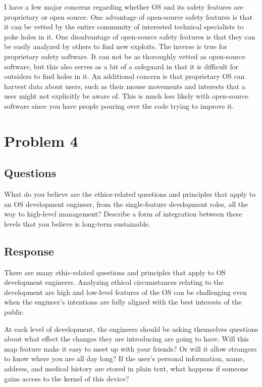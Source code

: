 \documentclass{assignment-x}
\begin{document}
I have a few major concerns regarding whether OS and its safety features are proprietary or open source. One advantage of open-source safety features is that it can be vetted by the entire community of interested technical specialists to poke holes in it.  One disadvantage of open-source safety features is that they can be easily analyzed by others to find new exploits. The inverse is true for proprietary safety software. It can not be as thoroughly vetted as open-source software, but this also serves as a bit of a safeguard in that it is difficult for outsiders to find holes in it. An additional concern is that proprietary OS can harvest data about users, such as their mouse movements and interests that a user might not explicitly be aware of. \cite{hackernews_windows10_privacy} This is much less likely with open-source software since you have people pouring over the code trying to improve it.

\section{Problem 4}
\subsection{Questions}
What do you believe are the ethics-related questions and principles that apply to an OS development engineer, from the single-feature development roles, all the way to high-level management?
Describe a form of integration between these levels that you believe is long-term sustainable.
\subsection{Response}
There are many ethic-related questions and principles that apply to OS development engineers. Analyzing ethical circumstances relating to the development are high and low-level features of the OS can be challenging even when the engineer's intentions are fully aligned with the best interests of the public. 

At each level of development, the engineers should be asking themselves questions about what effect the changes they are introducing are going to have. Will this map feature make it easy to meet up with your friends? Or will it allow strangers to know where you are all day long? If the user's personal information, name, address, and medical history are stored in plain text, what happens if someone gains access to the kernel of this device?
\end{document}
